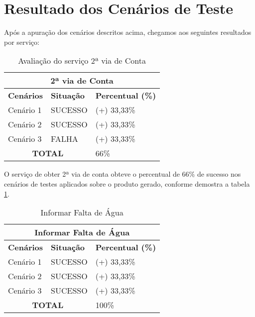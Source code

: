\section{Resultado dos Cenários de Teste}

Após a apuração dos cenários descritos acima, chegamos aos seguintes resultados por serviço:

\begin{table}[H]
	\center
	\footnotesize
	\caption{Avaliação do serviço 2ª via de Conta }
	\label{tabela:avaliacaoSegundaViaConta}
	\begin{tabular}{|p{3cm}|p{3cm}|p{3cm}|}
		\hline
		\multicolumn{3}{|c|}{\textbf{2ª via de Conta}} \\
		\hline
		\textbf{Cenários}  	& \textbf{Situação} & \textbf{Percentual (\%)}  \\
		\hline		
		Cenário 1			& SUCESSO 		& (+) 33,33\% 	\\
		\hline
		Cenário 2 			& SUCESSO		& (+) 33,33\% 	\\
		\hline
		Cenário 3 			& FALHA 		& (+) 33,33\%	\\
		\hline		
		\multicolumn{2}{|c|}{\textbf{TOTAL}}	& 66\% 	\\
		\hline				
	\end{tabular}
\end{table}

O serviço de obter 2ª via de conta obteve o percentual de 66\% de sucesso nos cenários de testes aplicados sobre o produto gerado, conforme demostra a tabela \ref{tabela:avaliacaoSegundaViaConta}. 


\begin{table}[H]
	\center
	\footnotesize
	\caption{Informar Falta de Água}
	\label{tabela:avaliacaoInformarFaltaAgua}
	\begin{tabular}{|p{3cm}|p{3cm}|p{3cm}|}
		\hline
		\multicolumn{3}{|c|}{\textbf{Informar Falta de Água}} \\
		\hline
		\textbf{Cenários}  	& \textbf{Situação} & \textbf{Percentual (\%)}  \\
		\hline		
		Cenário 1			& SUCESSO 		& (+) 33,33\% 	\\
		\hline
		Cenário 2 			& SUCESSO		& (+) 33,33\% 	\\
		\hline
		Cenário 3 			& SUCESSO 		& (+) 33,33\%	\\
		\hline		
		\multicolumn{2}{|c|}{\textbf{TOTAL}}	& 100\% 	\\
		\hline				
	\end{tabular}
\end{table}

